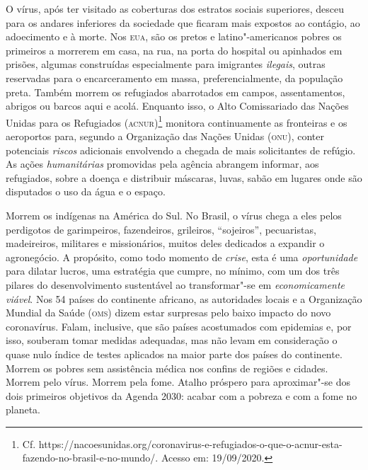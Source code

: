 O vírus, após ter visitado as coberturas dos estratos sociais
superiores, desceu para os andares inferiores da sociedade que ficaram
mais expostos ao contágio, ao adoecimento e à morte. Nos \textsc{eua}, são os
pretos e latino"-americanos pobres os primeiros a morrerem em casa, na
rua, na porta do hospital ou apinhados em prisões, algumas construídas
especialmente para imigrantes \emph{ilegais}, outras reservadas para o
encarceramento em massa, preferencialmente, da população preta. Também
morrem os refugiados abarrotados em campos, assentamentos, abrigos ou
barcos aqui e acolá. Enquanto isso, o Alto Comissariado das Nações
Unidas para os Refugiados (\textsc{acnur})\footnote{Cf.
  https://nacoesunidas.org/coronavirus-e-refugiados-o-que-o-acnur-esta-fazendo-no-brasil-e-no-mundo/.
  Acesso em: 19/09/2020.} monitora continuamente as fronteiras e os
aeroportos para, segundo a Organização das Nações Unidas (\textsc{onu}), conter
potenciais \emph{riscos} adicionais envolvendo a chegada de mais
solicitantes de refúgio. As ações \emph{humanitárias} promovidas pela
agência abrangem informar, aos refugiados, sobre a doença e distribuir
máscaras, luvas, sabão em lugares onde são disputados o uso da água e o
espaço.

Morrem os indígenas na América do Sul. No Brasil, o vírus chega a eles
pelos perdigotos de garimpeiros, fazendeiros, grileiros, ``sojeiros'',
pecuaristas, madeireiros, militares e missionários, muitos deles
dedicados a expandir o agronegócio. A propósito, como todo momento de
\emph{crise}, esta é uma \emph{oportunidade} para dilatar lucros, uma
estratégia que cumpre, no mínimo, com um dos três pilares do
desenvolvimento sustentável ao transformar"-se em \emph{economicamente
viável}. Nos 54 países do continente africano, as autoridades locais e a
Organização Mundial da Saúde (\textsc{oms}) dizem estar surpresas pelo baixo
impacto do novo coronavírus. Falam, inclusive, que são países
acostumados com epidemias e, por isso, souberam tomar medidas adequadas,
mas não levam em consideração o quase nulo índice de testes aplicados na
maior parte dos países do continente. Morrem os pobres sem assistência
médica nos confins de regiões e cidades. Morrem pelo vírus. Morrem pela
fome. Atalho próspero para aproximar"-se dos dois primeiros objetivos da
Agenda 2030: acabar com a pobreza e com a fome no
planeta.


